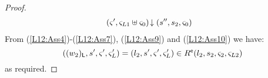 \begin{lemma}[]
\begin{proof}
\begin{align}
%
	& \extendsAM{\amod{}', \amod{L1} \uplus \amod{0}}{s''}{s_2}{\amod{0}}  \label{L12:Ass10}
\end{align}
%
From (\ref{L12:Ass4})-(\ref{L12:Ass7}), (\ref{L12:Ass9}) and (\ref{L12:Ass10}) we have:
%
\begin{equation}
	((w_2)_{\textsf{L}}, s', \varsigma_{}', \varsigma_{L}') = (l_2, s', \varsigma_{}', \varsigma_{L}') \in R^{\textsf{e}}(l_2, s_2, \varsigma_{2}, \varsigma_{L2}) \nonumber
\end{equation}
% 
as required.
\end{proof}
%
%
\end{lemma}
%
%
